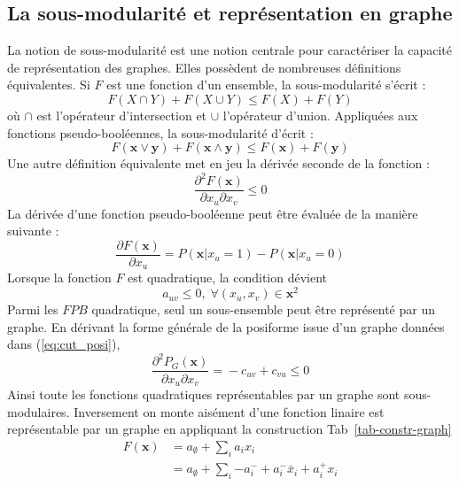 \documentclass[../main/These_Mathias_Paget.tex]{subfiles}
\begin{document}
\subsection{La sous-modularité et représentation en graphe}
	La notion de sous-modularité est une notion centrale pour caractériser la capacité de représentation des graphes. Elles possèdent de nombreuses définitions équivalentes. Si $F$ est une fonction d'un ensemble, la sous-modularité s'écrit :
	\begin{equation}
		F(X \cap Y) + F(X \cup Y) \leq F(X) + F(Y)
	\end{equation}
où $\cap$ est l'opérateur d'intersection et $\cup$ l'opérateur d'union. Appliquées aux fonctions pseudo-booléennes, la sous-modularité d'écrit :
	\begin{equation}
		\label{eq:sous_mod_bin}
		F(\boldsymbol{x} \vee \boldsymbol{y}) + F(\boldsymbol{x} \wedge \boldsymbol{y}) \leq F(\boldsymbol{x}) + F(\boldsymbol{y})
	\end{equation}
Une autre définition équivalente met en jeu la dérivée seconde de la fonction :
	\begin{equation}
	\frac{\partial^{2} F(\boldsymbol{x})}{\partial x_u \partial x_v} \leq 0
	\end{equation}	
La dérivée d'une fonction pseudo-booléenne peut être évaluée de la manière suivante :
	\begin{equation}
	\frac{\partial F(\boldsymbol{x})}{\partial x_u} = P(\boldsymbol{x}|x_u=1) - P(\boldsymbol{x}|x_u=0)
	\end{equation}
Lorsque la fonction $F$ est quadratique, la condition dévient
	\begin{equation}
	a_{uv} \leq 0, \; \forall (x_u,x_v) \in  \boldsymbol{x}^2
	\end{equation}	
Parmi les $FPB$ quadratique, seul un sous-ensemble peut être représenté par un graphe. En dérivant la forme générale de la posiforme issue d'un graphe données dans (\ref{eq:cut_posi}),
	\begin{equation}
	\frac{\partial^{2} P_G(\boldsymbol{x})}{\partial x_u \partial x_v} = {}-c_{uv}+c_{vu} \leq 0 
	\end{equation}
Ainsi toute les fonctions quadratiques représentables par un graphe sont sous-modulaires. Inversement on monte aisément d'une fonction linaire est représentable par un graphe en appliquant la construction Tab~\ref{tab-constr-graph}
	\begin{equation}
	\begin{aligned}
		F(\boldsymbol{x}) &= a_{ \emptyset} +  \sum_{i}{a_ix_i} \\
						 &= a_{ \emptyset} +  \sum_{i}{-a^{-}_i + {a^{-}_i\bar{x}_i} + a^{+}_ix_i}
	\end{aligned}
	\end{equation}
\end{document}
